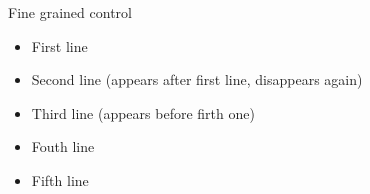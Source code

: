 \documentclass[]{beamer}
\begin{document}
\begin{frame}{Fine grained control}
  \begin{itemize}
    \item<1-> First line
    \item<2>  Second line (appears after first line, disappears again)
    \item<3-4> Third line (appears before firth one)
    \item<4-> Fouth line
    \item<5-> Fifth line
  \end{itemize}

\end{frame}



\end{document}
